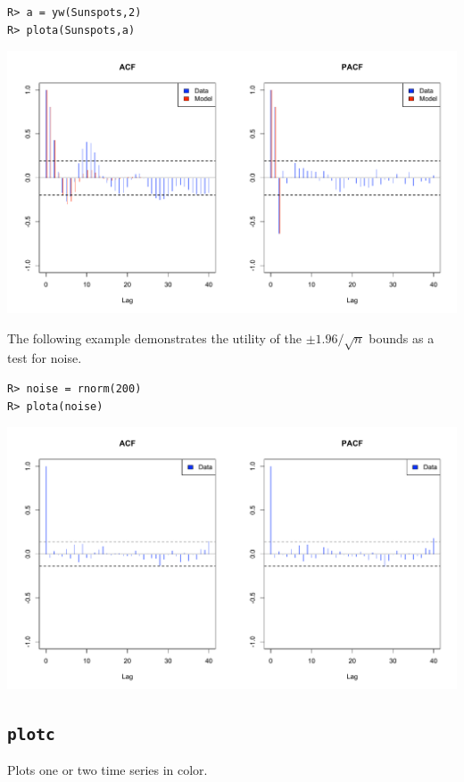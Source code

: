 \documentclass[12pt]{article}
\begin{document}
\begin{verbatim}
R> a = yw(Sunspots,2)
R> plota(Sunspots,a)
\end{verbatim}

\begin{center}
\includegraphics[scale=0.3]{Rplot-22.pdf}
\end{center}

\noindent
The following example demonstrates the utility of the $\pm1.96/\sqrt{n}$ bounds
as a test for noise.

\begin{verbatim}
R> noise = rnorm(200)
R> plota(noise)
\end{verbatim}

\begin{center}
\includegraphics[scale=0.3]{Rplot-8.pdf}
\end{center}

\newpage

\subsection{\tt plotc}
Plots one or two time series in color.
\end{document}

